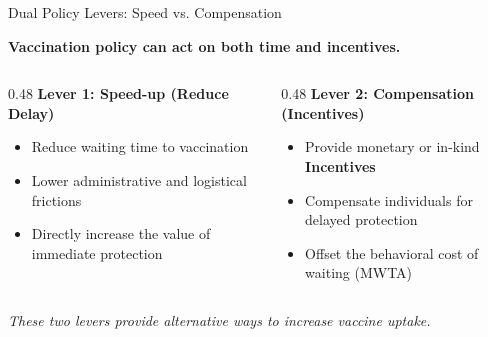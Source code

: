 \begin{frame}{Dual Policy Levers: Speed vs. Compensation}
    \begin{center}
        \textbf{Vaccination policy can act on both time and incentives.}
    \end{center}

    \vspace{1em}
    \begin{columns}[T]
        \begin{column}{0.48\textwidth}
            \textbf{Lever 1: \textbf{Speed-up} (Reduce \textbf{Delay})}
            \begin{itemize}
                \item Reduce waiting time to vaccination
                \item Lower administrative and logistical frictions
                \item Directly increase the value of immediate protection
            \end{itemize}
        \end{column}
        
        \hfill
        
        \begin{column}{0.48\textwidth}
            \textbf{Lever 2: \textbf{Compensation} (\textbf{Incentives})}
            \begin{itemize}
                \item Provide monetary or in-kind \textbf{Incentives}
                \item Compensate individuals for delayed protection
                \item Offset the behavioral cost of waiting (MWTA)
            \end{itemize}
        \end{column}
    \end{columns}
    
    \vfill
    \begin{center}
        \textit{These two levers provide alternative ways to increase vaccine uptake.}
    \end{center}
\end{frame}
